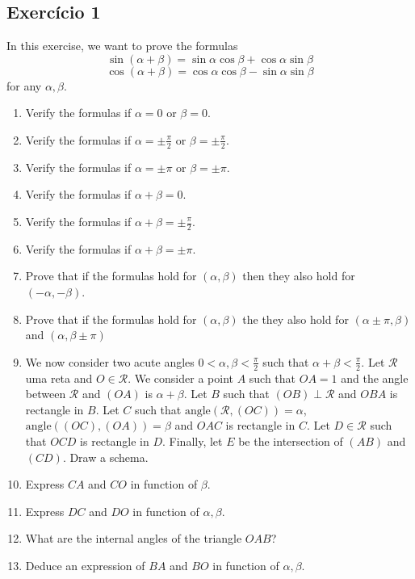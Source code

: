 \subsection*{Exercício 1}

In this exercise, we want to prove the formulas
$$
\sin\left(\alpha + \beta\right) =
{\sin \alpha \cos \beta} + {\cos \alpha \sin \beta}
$$
$$
\cos\left(\alpha + \beta\right) =
{\cos \alpha \cos \beta} - {\sin \alpha \sin \beta}
$$
for any $\alpha, \beta$.

\begin{enumerate}
\item Verify the formulas if $\alpha = 0$ or $\beta = 0$.
\item Verify the formulas if $\alpha = \pm\frac{\pi}{2}$ or
  $\beta = \pm\frac{\pi}{2}$.
\item Verify the formulas if $\alpha = \pm\pi$ or $\beta = \pm\pi$.
\item Verify the formulas if $\alpha + \beta = 0$.
\item Verify the formulas if $\alpha + \beta = \pm\frac{\pi}{2}$.
\item Verify the formulas if $\alpha + \beta = \pm\pi$.
\item Prove that if the formulas hold for $(\alpha, \beta)$ then they also hold
  for $(-\alpha, -\beta)$.
\item Prove that if the formulas hold for $(\alpha, \beta)$ the they also hold
  for $(\alpha\pm\pi, \beta)$ and $(\alpha, \beta\pm\pi)$
\item We now consider two acute angles $0 < \alpha, \beta < \frac{\pi}{2}$
  such that $\alpha + \beta < \frac{\pi}{2}$.
Let $\mathcal R$ uma reta and $O \in \mathcal R$. We consider a point
$A$ such that $OA = 1$ and the angle between $\mathcal R$ and $(OA)$ is
$\alpha+\beta$. Let $B$ such that $(OB) \perp \mathcal R$ and
$OBA$ is rectangle in $B$. Let $C$ such that
$\text{angle}\left(\mathcal R, (OC)\right) = \alpha$,
$\text{angle}\left((OC), (OA)\right) = \beta$ and
$OAC$ is rectangle in $C$. Let $D \in \mathcal R$ such that $OCD$ is rectangle
in $D$. Finally, let $E$ be the intersection of $(AB)$ and $(CD)$.
Draw a schema.
\item Express $CA$ and $CO$ in function of $\beta$.
\item Express $DC$ and $DO$ in function of $\alpha, \beta$.
\item What are the internal angles of the triangle $OAB$?
\item Deduce an expression of $BA$ and $BO$ in function of $\alpha, \beta$.

\end{enumerate}
